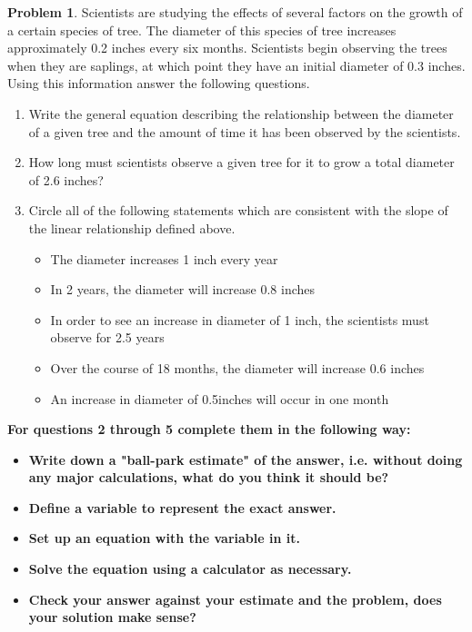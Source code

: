 \documentclass[11pt]{scrartcl}
\theoremstyle{definition}
\newtheorem{problem}[theorem]{Problem}
\begin{document}
\begin{problem}
	Scientists are studying the effects of several factors on the growth of a certain species of tree. The diameter of this species of tree increases approximately 0.2 inches every six months. Scientists begin observing the trees when they are saplings, at which point they have an initial diameter of 0.3 inches. Using this information answer the following questions.
\begin{enumerate}[label=\alph*)]
	\item Write the general equation describing the relationship between the diameter of a given tree and the amount of time it has been observed by the scientists.
	\item How long must scientists observe a given tree for it to grow a total diameter of 2.6 inches?
	\item Circle all of the following statements which are consistent with the slope of the linear relationship defined above.
	\begin{itemize}
		\item The diameter increases 1 inch every year
		\item In 2 years, the diameter will increase 0.8 inches
		\item In order to see an increase in diameter of 1 inch, the scientists must observe for 2.5 years
		\item Over the course of 18 months, the diameter will increase 0.6 inches
		\item An increase in diameter of 0.5inches will occur in one month
	\end{itemize}
\end{enumerate}	
\end{problem}

\noindent
\textbf{For questions 2 through 5 complete them in the following way:}
\begin{itemize}
	\item \textbf{Write down a "ball-park estimate" of the answer, i.e. without doing any major calculations, what do you think it should be?}
	\item \textbf{ Define a variable to represent the exact answer.}
	\item \textbf{Set up an equation with the variable in it.}
	\item \textbf{Solve the equation using a calculator as necessary.}
	\item \textbf{Check your answer against your estimate and the problem, does your solution make sense?}
\end{itemize}
\end{document}
